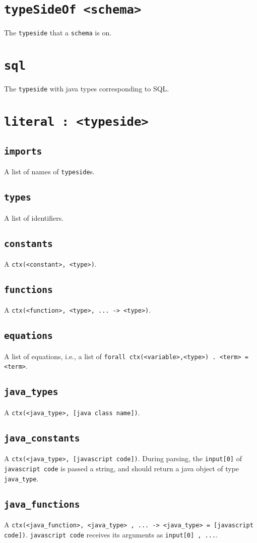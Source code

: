 \documentclass[10pt]{book}
\begin{document}
\section{{\tt typeSideOf <schema>}}
The {\tt typeside} that a {\tt schema} is on.

\section{{\tt sql}}
The {\tt typeside} with java types corresponding to SQL.

\section{{\tt literal : <typeside>}}
\subsection{{\tt imports}}
A list of names of {\tt typeside}s.
\subsection{{\tt types}}
A list of identifiers.
\subsection{{\tt constants}}
A {\tt ctx(<constant>, <type>)}.
\subsection{{\tt functions}}
A {\tt ctx(<function>, <type>, ... -> <type>)}.
\subsection{{\tt equations}}
A list of equations, i.e., a list of {\tt forall ctx(<variable>,<type>) . <term> = <term>}.  
\subsection{{\tt java\_types}}
A {\tt ctx(<java\_type>, [java class name])}.  
\subsection{{\tt java\_constants}}
A {\tt ctx(<java\_type>, [javascript code])}.  During parsing, the {\tt input[0]} of {\tt javascript code} is passed a string, and should return a java object of type {\tt java\_type}.
\subsection{{\tt java\_functions}}
A {\tt ctx(<java\_function>, <java\_type> , ... -> <java\_type> = [javascript code])}.  {\tt javascript code} receives its arguments as {\tt input[0] , ...}.
\end{document}
